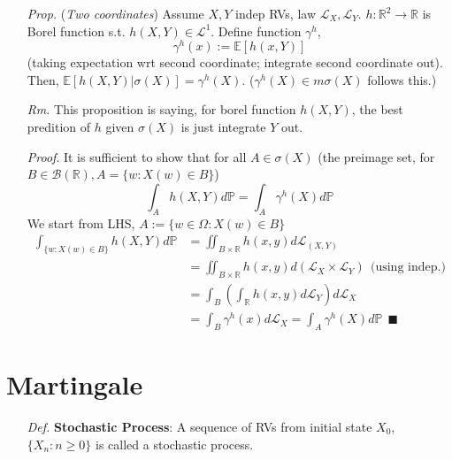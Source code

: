 \documentclass[a4paper,12pt,twoside]{book}
\begin{document}
\begin{itemize}
	\item[\textit{Prop.}] (\textit{Two coordinates}) Assume $X,Y$ indep RVs, law $\mathcal{L}_X, \mathcal{L}_Y$. $h: \mathbb{R}^2 \to \mathbb{R}$ is Borel function s.t. $h(X,Y)\in \mathcal{L}^1$. Define function $\gamma^h$,
	\begin{equation}
		\gamma^h(x) := \mathbb{E}\left[h(x, Y)\right] 
	\end{equation}
	(taking expectation wrt second coordinate; integrate second coordinate out). Then, $\mathbb{E}\left[h(X,Y)|\sigma(X)\right]=\gamma^h(X)$. ($\gamma^h(X)\in m\sigma(X)$ follows this.)

	\item[\textit{Rm.}] This proposition is saying, for borel function $h(X,Y)$, the best predition of $h$ given $\sigma(X)$ is just integrate $Y$ out.

	\item[\textit{Proof}.] It is sufficient to show that for all $A \in \sigma(X)$ (the preimage set, for $B\in \mathscr{B}(\mathbb{R}), A=\{w: X(w)\in B\}$)
	\begin{equation}
		\int_A h(X,Y) d\mathbb{P} = \int_A \gamma^h(X) d\mathbb{P}
	\end{equation}
	We start from LHS, $A:= \{w\in \Omega: X(w)\in B\}$
	\begin{equation}
		\begin{split}
			\int_{\{w:X(w)\in B\}} h(X,Y) d\mathbb{P} &= \iint_{B\times \mathbb{R}}h(x,y) d \mathcal{L}_{(X,Y)}\\
			&= \iint_{B\times \mathbb{R}}h(x,y) d (\mathcal{L}_X \times  \mathcal{L}_Y)~~\text{(using indep.)}\\
			&= \int_B \left(\int_{\mathbb{R}}h(x,y)d \mathcal{L}_Y  \right) d \mathcal{L}_X\\
			&=\int_B \gamma^h(x) d \mathcal{L}_X = \int_A \gamma^h(X) d\mathbb{P}~~\blacksquare
		\end{split}
	\end{equation}
\end{itemize}

\section{Martingale}
\begin{itemize}
	\item[\textit{Def.}] \textbf{Stochastic Process}: A sequence of RVs from initial state $X_0$, $\{X_n: n\geq 0\}$ is called a stochastic process.
\end{itemize}
\end{document}
